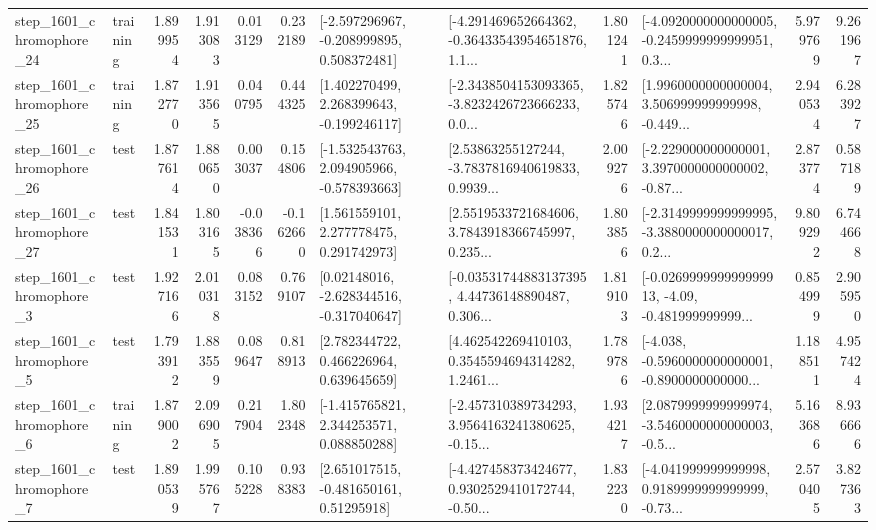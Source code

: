 \begin{tabular}{llrrrrllrlrr}
 step\_1601\_chromophore\_24 &  training &      1.899954 &    1.913083 &      0.013129 &  0.232189 &   [-2.597296967, -0.208999895, 0.508372481] &  [-4.291469652664362, -0.36433543954651876, 1.1... &       1.801241 &  [-4.0920000000000005, -0.2459999999999951, 0.3... &            5.979769 &          9.261967 \\
 step\_1601\_chromophore\_25 &  training &      1.872770 &    1.913565 &      0.040795 &  0.444325 &    [1.402270499, 2.268399643, -0.199246117] &  [-2.3438504153093365, -3.8232426723666233, 0.0... &       1.825746 &  [1.9960000000000004, 3.506999999999998, -0.449... &            2.940534 &          6.283927 \\
 step\_1601\_chromophore\_26 &      test &      1.877614 &    1.880650 &      0.003037 &  0.154806 &   [-1.532543763, 2.094905966, -0.578393663] &  [2.53863255127244, -3.7837816940619833, 0.9939... &       2.009276 &  [-2.229000000000001, 3.3970000000000002, -0.87... &            2.873774 &          0.587189 \\
 step\_1601\_chromophore\_27 &      test &      1.841531 &    1.803165 &     -0.038366 & -0.162660 &     [1.561559101, 2.277778475, 0.291742973] &  [2.5519533721684606, 3.7843918366745997, 0.235... &       1.803856 &  [-2.3149999999999995, -3.3880000000000017, 0.2... &            9.809292 &          6.744668 \\
  step\_1601\_chromophore\_3 &      test &      1.927166 &    2.010318 &      0.083152 &  0.769107 &    [0.02148016, -2.628344516, -0.317040647] &  [-0.03531744883137395, 4.44736148890487, 0.306... &       1.819103 &  [-0.026999999999999913, -4.09, -0.481999999999... &            0.854999 &          2.905950 \\
  step\_1601\_chromophore\_5 &      test &      1.793912 &    1.883559 &      0.089647 &  0.818913 &     [2.782344722, 0.466226964, 0.639645659] &  [4.462542269410103, 0.3545594694314282, 1.2461... &       1.789786 &  [-4.038, -0.5960000000000001, -0.8900000000000... &            1.188511 &          4.957424 \\
  step\_1601\_chromophore\_6 &  training &      1.879002 &    2.096905 &      0.217904 &  1.802348 &    [-1.415765821, 2.344253571, 0.088850288] &  [-2.457310389734293, 3.9564163241380625, -0.15... &       1.934217 &  [2.0879999999999974, -3.5460000000000003, -0.5... &            5.163686 &          8.936666 \\
  step\_1601\_chromophore\_7 &      test &      1.890539 &    1.995767 &      0.105228 &  0.938383 &     [2.651017515, -0.481650161, 0.51295918] &  [-4.427458373424677, 0.9302529410172744, -0.50... &       1.832230 &  [-4.041999999999998, 0.9189999999999999, -0.73... &            2.570405 &          3.827363 \\

\end{tabular}
